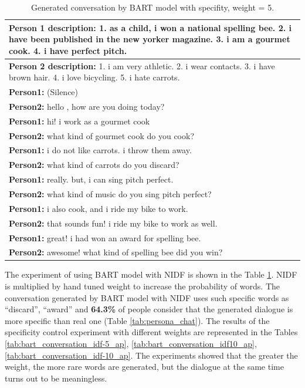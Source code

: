 \begin{table}[H]
 \begin{tabular}{|p{14cm}|}
 \hline
 \textbf{Person 1 description:} 1. as a child, i won a national spelling bee. 2. i have been published in the new yorker magazine. 3. i am a gourmet cook. 4. i have perfect pitch. \\
 \hline
 \textbf{Person 2 description:} 1. i am very athletic. 2. i wear contacts. 3. i have brown hair. 4. i love bicycling. 5. i hate carrots. \\
 \hline
 \textbf{Person1:} (Silence) \\
 \textbf{Person2:} hello , how are you doing today? \\ 
 \textbf{Person1:} hi! i work as a gourmet cook \\
 \textbf{Person2:} what kind of gourmet cook do you cook?\\
 \textbf{Person1:} i do not like carrots. i throw them away.\\
 \textbf{Person2:} what kind of carrots do you discard? \\
 \textbf{Person1:} really. but, i can sing pitch perfect.\\
 \textbf{Person2:} what kind of music do you sing pitch perfect?\\
 \textbf{Person1:} i also cook, and i ride my bike to work.\\
 \textbf{Person2:} that sounds fun! i ride my bike to work as well. \\
 \textbf{Person1:} great! i had won an award for spelling bee. \\
 \textbf{Person2:} awesome! what kind of spelling bee did you win?\\
 \hline
 \end{tabular}
\caption{Generated conversation by BART model with specifity, weight = 5.}
\label{tab:bart_nidf}
\end{table}

The experiment of using BART model with NIDF is shown in the Table \ref{tab:bart_nidf}. NIDF is multiplied by hand tuned weight to increase the probability of words. The conversation generated by BART model with NIDF uses such specific words as ``discard'', ``award'' and \textbf{64.3\%} of people consider that the generated dialogue is more specific than real one (Table \ref{tab:persona_chat}). The results of the specificity control experiment with different weights are represented in the Tables \ref{tab:bart_conversation_idf-5_ap}, \ref{tab:bart_conversation_idf10_ap}, \ref{tab:bart_conversation_idf-10_ap}. The experiments showed that the greater the weight, the more rare words are generated, but the dialogue at the same time turns out to be meaningless.

